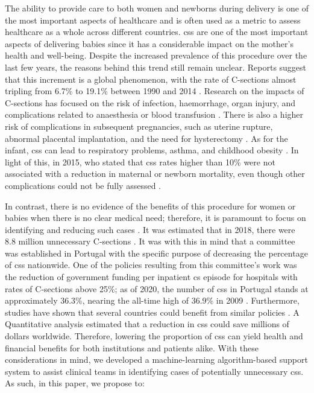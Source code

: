 
The ability to provide care to both women and newborns during delivery is one of the most important aspects of healthcare and is often used as a metric to assess healthcare as a whole across different countries. \acp{cs} are one of the most important aspects of delivering babies since it has a considerable impact on the mother's health and well-being. Despite the increased prevalence of this procedure over the last few years, the reasons behind this trend still remain unclear. Reports suggest that this increment is a global phenomenon, with the rate of C-sections almost tripling from 6.7\% to 19.1\% between 1990 and 2014 \cite{betranIncreasingTrendCaesarean2016,chenNonClinicalInterventions2018}. Research on the impacts of C-sections has focused on the risk of infection, haemorrhage, organ injury, and complications related to anaesthesia or blood transfusion \cite{caesereanrisk1,caesereanrisk2}.
There is also a higher risk of complications in subsequent pregnancies, such as uterine rupture, abnormal placental implantation, and the need for hysterectomy \cite{caesereanrisk3,caesereanrisk4}. As for the infant, \acp{cs} can lead to respiratory problems, asthma, and childhood obesity \cite{caesereanrisk3}.
In light of this, in 2015, \ac{who} stated that \acp{cs} rates higher than 10\% were not associated with a reduction in maternal or newborn mortality, even though other complications could not be fully assessed \cite{worldhealthorganizationhumanreproductionprogramme10april2015WHOStatementCaesarean2015}.

In contrast, there is no evidence of the benefits of this procedure for women or babies when there is no clear medical need; therefore, it is paramount to focus on identifying and reducing such cases \cite{chenNonClinicalInterventions2018}.  It was estimated that in 2018, there were 8.8 million unnecessary C-sections \cite{hoxhaCaesareanSectionsHealth2021}.
It was with this in mind that a committee was established in Portugal with the specific purpose of decreasing the percentage of \acp{cs} nationwide. One of the policies resulting from this committee's work was the reduction of government funding per inpatient \ac{cs} episode for hospitals with rates of C-sections above 25\%; as of 2020, the number of \acp{cs} in Portugal stands at approximately 36.3\%, nearing the all-time high of 36.9\% in 2009 \cite{pordatacesarianas}. Furthermore, studies have shown that several countries could benefit from similar policies \cite{hoxhaCaesareanSectionsHealth2021}.
A Quantitative analysis estimated that a reduction in \acp{cs} could save millions of dollars \cite{callanderFinancingMaternityEarly2020} worldwide. Therefore, lowering the proportion of \acp{cs} can yield health and financial benefits for both institutions and patients alike. With these considerations in mind, we developed a machine-learning algorithm-based support system to assist clinical teams in identifying cases of potentially unnecessary \acp{cs}. As such, in this paper, we propose to:


